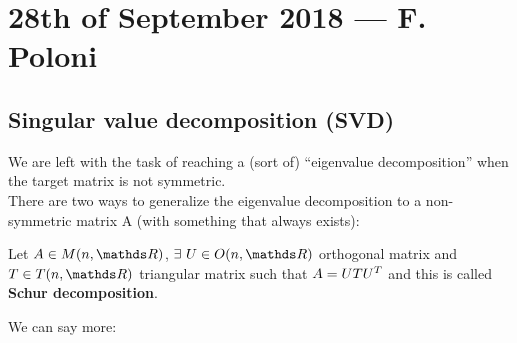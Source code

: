 \documentclass[computationalMathematics.tex]{subfiles}
\begin{document}
\chapter{28th of September 2018 --- F. Poloni}

\section{Singular value decomposition (SVD)}
We are left with the task of reaching a (sort of) ``eigenvalue decomposition'' when the target matrix is not symmetric.\\
There are two ways to generalize the eigenvalue decomposition to a
non-symmetric matrix A (with something that always exists):

\begin{definition}
  Let $A \in M(n, \R)$, $\exists~U \in O(n, \R)$ orthogonal matrix and $T \in T(n, \R)$ triangular matrix such that $A = UT{U}^{T}$ and this is called \textbf{Schur decomposition}.
\end{definition}

\noindent We can say more:
\end{document}

